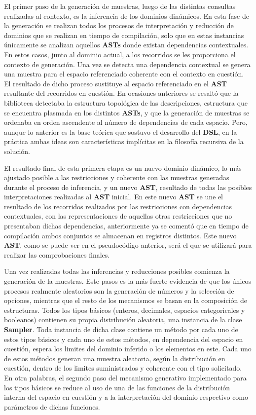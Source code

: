 El primer paso de la generación de muestras, luego de las distintas consultas realizadas al contexto,
es la inferencia de los dominios dinámicos. En esta fase de la generación se realizan todos los procesos
de interpretación y reducción de dominios que se realizan en tiempo de compilación, solo que en estas
instancias únicamente se analizan aquellos {\bf ASTs} donde existan dependencias contextuales. 
En estos casos, junto al dominio actual, a los recorridos se les proporciona el contexto de generación. 
Una vez se detecta una dependencia contextual se genera una muestra para el espacio referenciado coherente con el 
contexto en cuestión. El resultado de dicho proceso sustituye al espacio referenciado en el {\bf AST} resultante 
del recorridos en cuestión. En ocasiones anteriores se resaltó que la biblioteca detectaba la estructura topológica de 
las descripciones, estructura que se encuentra plasmada en los distintos {\bf ASTs}, y que la generación de muestras 
se ordenaba en orden ascendente al número de dependencias de cada espacio. Pero, aunque lo anterior es la base 
teórica que sostuvo el desarrollo del {\bf DSL}, en la práctica ambas ideas son características implícitas en la 
filosofía recursiva de la solución.

El resultado final de esta primera etapa es un nuevo dominio dinámico, lo más ajustado posible a las restricciones
y coherente con las muestras generadas durante el proceso de inferencia, y un nuevo {\bf AST}, resultado de todas las
posibles interpretaciones realizadas al {\bf AST} inicial. En este nuevo {\bf AST} se une el resultado de los recorridos
realizados por las restricciones con dependencias contextuales, con las representaciones de aquellas otras restricciones
que no presentaban dichas dependencias, anteriormente ya se comentó que en tiempo de compilación ambos conjuntos
se almacenan en registros distintos. Este nuevo {\bf AST}, como se puede ver en el pseudocódigo anterior, será el que se
utilizará para realizar las comprobaciones finales.

Una vez realizadas todas las inferencias y reducciones posibles comienza la generación de la muestras. Este pasos es
la más fuerte evidencia de que los únicos procesos realmente aleatorios son la generación de números y la selección de
opciones, mientras que el resto de los mecanismos se basan en la composición de estructuras. Todos los tipos básicos
(enteros, decimales, espacios categoricales y booleanos) contienen su propia distribución aleatoria, una instancia de
la clase {\bf Sampler}. Toda instancia de dicha clase contiene un método por cada uno de estos tipos básicos y cada uno de
estos métodos, en dependencia del espacio en cuestión, espera los limites del dominio inferido o los elementos en este.
Cada uno de estos métodos generan una muestra aleatoria, según la distribución en cuestión, dentro de los limites
suministrados y coherente con el tipo solicitado. En otra palabras, el segundo paso del mecanismo generativo implementado
para los tipos básicos se reduce al uso de una de las funciones de la distribución interna del espacio en cuestión y a la
interpretación del dominio respectivo como parámetros de dichas funciones.

